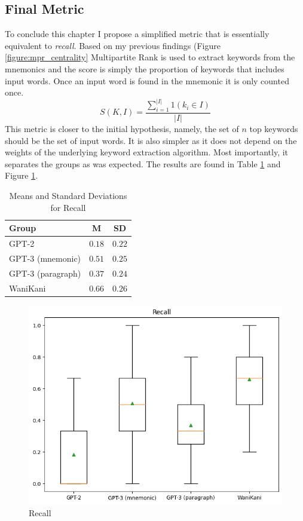 \subsection{Final Metric}
To conclude this chapter I propose a simplified metric that is essentially equivalent to \emph{recall}. Based on my previous findings (Figure \ref{figure:mpr_centrality} Multipartite Rank is used to extract keywords from the mnemonics and the score is simply the proportion of keywords that includes input words. Once an input word is found in the mnemonic it is only counted once. 
\begin{equation}
    S(K, I) = \frac{\sum_{i=1}^{|I|} 1(k_i \in I)}{|I|}
\end{equation}
This metric is closer to the initial hypothesis, namely, the set of $n$ top keywords should be the set of input words. It is also simpler as it does not depend on the weights of the underlying keyword extraction algorithm. Most importantly, it separates the groups as was expected. The results are found in Table \ref{tab:final_metric_recall} and Figure \ref{figure:recall}.
\begin{table}[ht] 
\centering
\caption{Means and Standard Deviations for Recall}
\label{table:group_stats}
\begin{tabular}{lcc}
\toprule
Group & M & SD\\
\midrule
GPT-2& $0.18$ & $0.22$ \\
GPT-3 (mnemonic) & $0.51$ & $0.25$ \\
GPT-3 (paragraph)& $0.37$ & $0.24$ \\
WaniKani & $0.66$ & $0.26$ \\
\bottomrule
\end{tabular}
\label{tab:final_metric_recall}
\end{table}
\begin{figure}
    \centering
    \includegraphics[width=400pt]{resources/recall.png}
    \caption{Recall}
    \label{figure:recall}
\end{figure}





